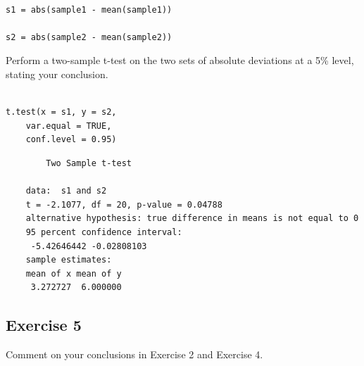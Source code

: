 \documentclass[a4paper,12pt]{article}
\begin{document}
\begin{framed}\begin{verbatim}

s1 = abs(sample1 - mean(sample1))

s2 = abs(sample2 - mean(sample2))

\end{verbatim}\end{framed}

\noindent Perform a two-sample t-test on the two sets of absolute deviations at a
5\% level, stating your conclusion.
\newpage 
\begin{framed}\begin{verbatim}

t.test(x = s1, y = s2, 
    var.equal = TRUE, 
    conf.level = 0.95)

\end{verbatim}\end{framed}


\begin{verbatim}
    	Two Sample t-test
    
    data:  s1 and s2
    t = -2.1077, df = 20, p-value = 0.04788
    alternative hypothesis: true difference in means is not equal to 0
    95 percent confidence interval:
     -5.42646442 -0.02808103
    sample estimates:
    mean of x mean of y 
     3.272727  6.000000 

\end{verbatim}    


\newpage 



\large 

\subsection*{Exercise 5}
\noindent Comment on your conclusions in Exercise 2 and Exercise 4.
\end{document}
